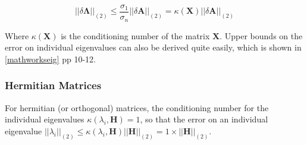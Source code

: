 \begin{equation}
||\delta\mathbf{\Lambda}||_{(2)} \leq \frac{\sigma_1}{\sigma_n} ||\delta\mathbf{A}||_{(2)} = \kappa(\mathbf{X})||\delta\mathbf{A}||_{(2)}
\end{equation}

Where $\kappa(\mathbf{X})$ is the conditioning number of the matrix $\mathbf{X}$. Upper bounds on the error on individual eigenvalues can also be derived quite easily, which is shown in \ref{mathworkseig} pp 10-12.

\subsubsection{Hermitian Matrices}
For hermitian (or orthogonal) matrices, the conditioning number for the individual eigenvalues  $\kappa(\lambda_i,\mathbf{H}) = 1$, so that the error on an individual eigenvalue $||\lambda_i||_{(2)} \leq \kappa(\lambda_i,\mathbf{H}) ||\mathbf{H}||_{(2)} = 1\times ||\mathbf{H}||_{(2)}$. 